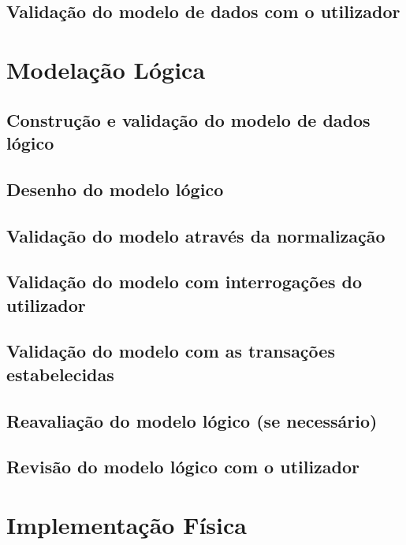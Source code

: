 \documentclass[11pt]{article} %
\begin{document}
\subsection{Validação do modelo de dados com o utilizador}




\section{Modelação Lógica}

\subsection{Construção e validação do modelo de dados lógico}

\subsection{Desenho do modelo lógico}

\subsection{Validação do modelo através da normalização}

\subsection{Validação do modelo com interrogações do utilizador}

\subsection{Validação do modelo com as transações estabelecidas}

\subsection{Reavaliação do modelo lógico (se necessário)}

\subsection{Revisão do modelo lógico com o utilizador}




\section{Implementação Física}
\end{document}
